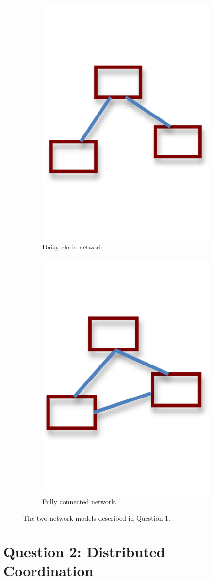 \documentclass[12pt]{article}
\begin{document}
\begin{figure}
\begin{subfigure}{.5\textwidth}
\centering
\includegraphics[width=.5\textwidth]{daisychain.pdf}
\caption{Daisy chain network.}
\end{subfigure}
\begin{subfigure}{0.5\textwidth}
\centering
\includegraphics[width=.5\textwidth]{fullyconnected.pdf}
\caption{Fully connected network.}
\end{subfigure}
\caption{The two network models described in Question 1.}
\label{fig:networks}
\end{figure}

\section*{Question 2: Distributed Coordination}
\end{document}
